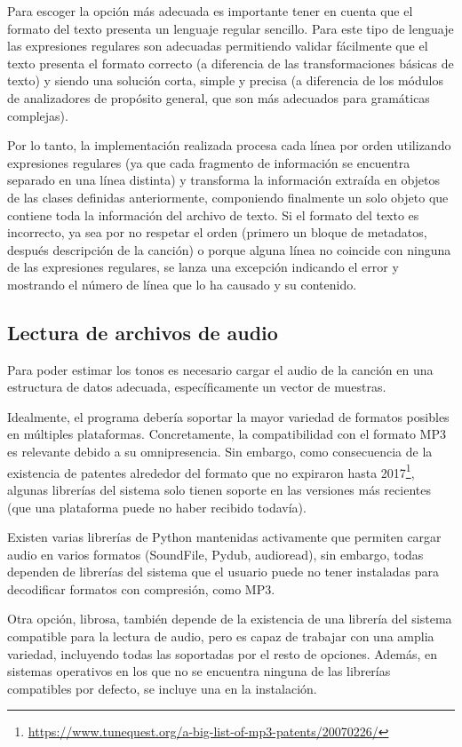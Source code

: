 Para escoger la opción más adecuada es importante tener en cuenta que el formato del texto presenta un lenguaje regular sencillo. Para este tipo de lenguaje las expresiones regulares son adecuadas permitiendo validar fácilmente que el texto presenta el formato correcto (a diferencia de las transformaciones básicas de texto) y siendo una solución corta, simple y precisa (a diferencia de los módulos de analizadores de propósito general, que son más adecuados para gramáticas complejas).

Por lo tanto, la implementación realizada procesa cada línea por orden utilizando expresiones regulares (ya que cada fragmento de información se encuentra separado en una línea distinta) y transforma la información extraída en objetos de las clases definidas anteriormente, componiendo finalmente un solo objeto que contiene toda la información del archivo de texto.  Si el formato del texto es incorrecto, ya sea por no respetar el orden (primero un bloque de metadatos, después descripción de la canción) o porque alguna línea no coincide con ninguna de las expresiones regulares, se lanza una excepción indicando el error y mostrando el número de línea que lo ha causado y su contenido.


\subsection{Lectura de archivos de audio}

Para poder estimar los tonos es necesario cargar el audio de la canción en una estructura de datos adecuada, específicamente un vector de muestras.

Idealmente, el programa debería soportar la mayor variedad de formatos posibles en múltiples plataformas. Concretamente, la compatibilidad con el formato MP3 es relevante debido a su omnipresencia. Sin embargo, como consecuencia de la existencia de patentes alrededor del formato que no expiraron hasta 2017\footnote{\url{https://www.tunequest.org/a-big-list-of-mp3-patents/20070226/}}, algunas librerías del sistema solo tienen soporte en las versiones más recientes (que una plataforma puede no haber recibido todavía).

Existen varias librerías de Python mantenidas activamente que permiten cargar audio en varios formatos (SoundFile, Pydub, audioread), sin embargo, todas dependen de librerías del sistema que el usuario puede no tener instaladas para decodificar formatos con compresión, como MP3. 

Otra opción, librosa, también depende de la existencia de una librería del sistema compatible para la lectura de audio, pero es capaz de trabajar con una amplia variedad, incluyendo todas las soportadas por el resto de opciones. Además, en sistemas operativos en los que no se encuentra ninguna de las librerías compatibles por defecto, se incluye una en la instalación.

